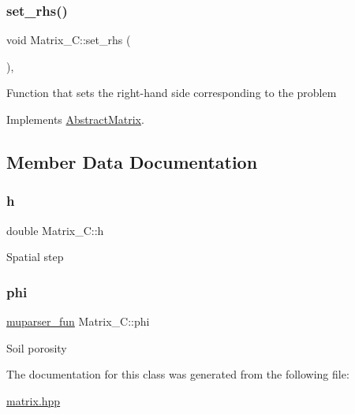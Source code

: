 \subsubsection{\texorpdfstring{set\+\_\+rhs()}{set\_rhs()}}
{\footnotesize\ttfamily void Matrix\+\_\+\+C\+::set\+\_\+rhs (\begin{DoxyParamCaption}{ }\end{DoxyParamCaption})\hspace{0.3cm}{\ttfamily [override]}, {\ttfamily [virtual]}}

Function that sets the right-\/hand side corresponding to the problem 

Implements \hyperlink{classAbstractMatrix_a1334661de25f76dc65f16538c167a03c}{Abstract\+Matrix}.



\subsection{Member Data Documentation}
\mbox{\label{classMatrix__C_ac381c022ef4080ac749c69d92a9f5927}} 
\subsubsection{\texorpdfstring{h}{h}}
{\footnotesize\ttfamily double Matrix\+\_\+\+C\+::h\hspace{0.3cm}{\ttfamily [private]}}

Spatial step \mbox{\label{classMatrix__C_a35d4d4197169e42d19a30fc6acca94bf}} 
\subsubsection{\texorpdfstring{phi}{phi}}
{\footnotesize\ttfamily \hyperlink{classmuparser__fun}{muparser\+\_\+fun} Matrix\+\_\+\+C\+::phi\hspace{0.3cm}{\ttfamily [private]}}

Soil porosity 

The documentation for this class was generated from the following file\+:\begin{DoxyCompactItemize}
\item 
\hyperlink{matrix_8hpp}{matrix.\+hpp}\end{DoxyCompactItemize}
